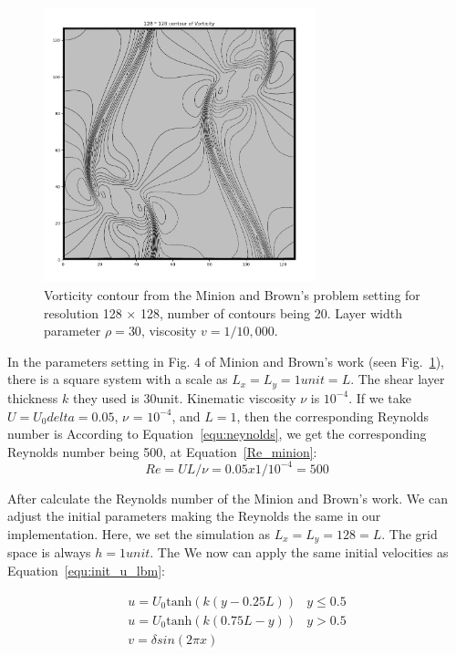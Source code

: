 \begin{figure}[tb]
   \centering
       \includegraphics[width=0.7\textwidth]{figures/double_c_128.png}
       \caption{Vorticity contour from the Minion and Brown's problem\cite{minion1997performance} setting  for resolution 128 $\times$ 128, number of contours being 20. Layer width parameter $\rho = 30$, viscosity $v=1/10,000$. }
       \label{fig:minion}
\end{figure}
In the parameters setting in Fig. 4 of Minion and Brown's work (seen Fig.~\ref{fig:minion}), there is a square system with a scale as $L_x = L_y = 1 unit = L$. The shear layer thickness $k$ they used is 30unit. Kinematic viscosity $\nu$ is $10^{-4}$. If we take $U = U_0 delta = 0.05$, $\nu$ = $10^{-4}$, and $L = 1$, then the corresponding Reynolds number is According to Equation~\ref{equ:neynolds}, we get the corresponding Reynolds number being 500, at Equation~\ref{Re_minion}:
\begin{equation}
\label{Re_minion}
    Re = UL / \nu = 0.05 x 1 / 10^{-4} = 500
\end{equation}

After calculate the Reynolds number of the Minion and Brown's work. We can adjust the initial parameters making the Reynolds the same in our implementation. Here, we set the simulation as $L_x = L_y = 128 = L$. The grid space is always $h = 1 unit$. The We now can apply the same initial velocities as Equation~\ref{equ:init_u_lbm}:

\begin{equation}
\label{equ:init_u_lbm}
    \begin{matrix}
u = U_0\mathrm{tanh}(k (y-0.25L)) & y \leqslant 0.5 \\ 
u = U_0\mathrm{tanh}(k (0.75L-y)) & y > 0.5  \\
v = \delta sin(2\pi x )
\end{matrix}
\end{equation}

